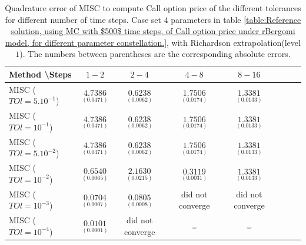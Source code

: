 \documentclass[11pt]{article}
\begin{document}
\begin{table}[h!]
\centering
\begin{tabular}{l*{6}{c}r}
Method \textbackslash  Steps            & $1-2$ & $2-4$ & $4-8$ & $8-16$  \\
\hline
MISC ($TOl=5.10^{-1}$)  & $\underset{(0.0471)}{\mathbf{ 4.7386}}$ & $\underset{( 0.0062)}{\mathbf{  0.6238}}$ & $\underset{(  0.0174
	)}{\mathbf{
		1.7506}}$ & $\underset{(  0.0133
	)}{\mathbf{ 
		1.3381
}}$ \\
MISC ($TOl=10^{-1}$)  & $\underset{(0.0471)}{\mathbf{ 4.7386}}$ & $\underset{( 0.0062)}{\mathbf{  0.6238}}$ & $\underset{(  0.0174
	)}{\mathbf{
		1.7506}}$ &  $\underset{(  0.0133
	)}{\mathbf{ 
		1.3381
}}$  \\
MISC ($TOl=5.10^{-2}$)  & $\underset{(0.0471)}{\mathbf{ 4.7386}}$ & $\underset{( 0.0062)}{\mathbf{  0.6238}}$ & $\underset{(  0.0174
	)}{\mathbf{
		1.7506}}$ &  $\underset{(  0.0133
	)}{\mathbf{ 
		1.3381
}}$  \\
MISC ($TOl=10^{-2}$)  & $\underset{( 0.0065) }{\mathbf{    0.6540
}}$ & $\underset{(0.0215)}{\mathbf{  2.1630}}$ & $\underset{(     0.0031
	
	)}{\mathbf{
		0.3119}}$ &  $\underset{(  0.0133
	)}{\mathbf{ 
		1.3381
}}$ \\
MISC ($TOl=10^{-3}$)  & $\underset{(0.0007 ) }{\mathbf{  0.0704  
}}$ & $\underset{(0.0008)}{\mathbf{0.0805}}$ &did not converge & did not converge  \\
MISC ($TOl=10^{-4}$)  & $\underset{(0.0001 ) }{\mathbf{   0.0101  
}}$ & did not converge &$\underset{-}{\mathbf{-}}$ & $\underset{-}{\mathbf{-}}$  \\
\hline
\end{tabular}
\caption{Quadrature error of MISC to compute Call option price of the different tolerances for different number of time steps. Case set $4$ parameters in table \ref{table:Reference solution, using MC with $500$ time steps, of Call option price under rBergomi model, for different parameter constellation.}, with Richardson extrapolation(level $1$). The numbers between parentheses are the corresponding absolute errors.}
\label{Quadrature error of MISC to compute Call option price of the different tolerances for different number of time steps. Case set $4$ parameters, with Richardson extrapolation(level $1$). The numbers between parentheses are the corresponding absolute errors.}
\end{table}
\end{document}
